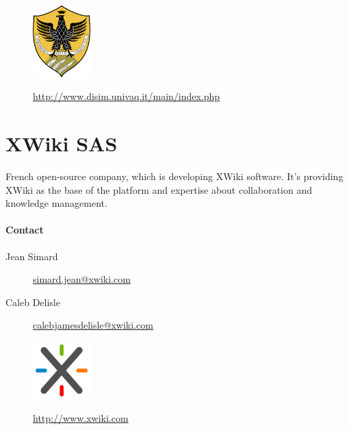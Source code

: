 \documentclass{learnpad}
\begin{document}
\begin{figure}[!htp]
	\centering
	\includegraphics[width=6em,keepaspectratio]{figures/univaq.png}\par
	\url{http://www.disim.univaq.it/main/index.php}
\end{figure}

\section{XWiki SAS}
French open-source company, which is developing XWiki software.  It's providing
XWiki as the base of the \learnpad platform and expertise about collaboration
and knowledge management.

\paragraph{Contact}
\begin{description}
	\item[Jean Simard] \href{mailto:simard.jean@xwiki.com}{simard.jean@xwiki.com}
	\item[Caleb Delisle] \href{mailto:calebjamesdelisle@xwiki.com}{calebjamesdelisle@xwiki.com}
\end{description}

\begin{figure}[!htp]
	\centering
	\includegraphics[width=6em,keepaspectratio]{figures/xwiki.png}\par
	\url{http://www.xwiki.com}
\end{figure}







% 
% 
\end{document}
